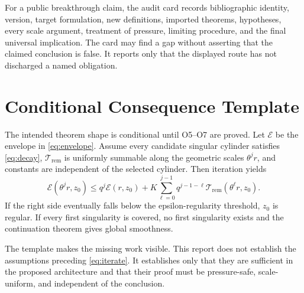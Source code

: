 \documentclass[conference]{../../../../Conference-LaTeX-template_10-17-19/IEEEtran}
\begin{document}
For a public breakthrough claim, the audit card records bibliographic identity, version, target formulation, new definitions, imported theorems, hypotheses, every scale argument, treatment of pressure, limiting procedure, and the final universal implication. The card may find a gap without asserting that the claimed conclusion is false. It reports only that the displayed route has not discharged a named obligation.

\section{Conditional Consequence Template}
The intended theorem shape is conditional until O5--O7 are proved. Let $\mathcal E$ be the envelope in \eqref{eq:envelope}. Assume every candidate singular cylinder satisfies \eqref{eq:decay}, $\mathcal T_{\mathrm{rem}}$ is uniformly summable along the geometric scales $\theta^jr$, and constants are independent of the selected cylinder. Then iteration yields
\begin{equation}
\mathcal E(\theta^j r,z_0)
\le q^j\mathcal E(r,z_0)+
K\sum_{\ell=0}^{j-1}q^{j-1-\ell}
\mathcal T_{\mathrm{rem}}(\theta^\ell r,z_0).
\label{eq:iterate}
\end{equation}
If the right side eventually falls below the epsilon-regularity threshold, $z_0$ is regular. If every first singularity is covered, no first singularity exists and the continuation theorem gives global smoothness.

The template makes the missing work visible. This report does not establish the assumptions preceding \eqref{eq:iterate}. It establishes only that they are sufficient in the proposed architecture and that their proof must be pressure-safe, scale-uniform, and independent of the conclusion.
\end{document}

